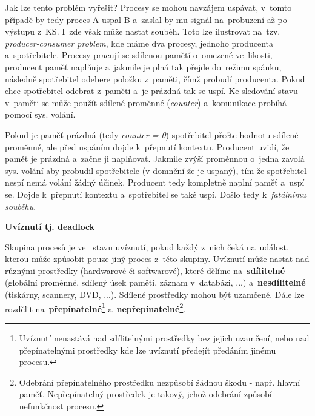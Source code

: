 \vspace{0,5cm}

Jak lze tento problém vyřešit? Procesy se mohou navzájem uspávat, v~tomto případě by tedy proces A uspal B a~zaslal by mu signál na~probuzení až po výstupu z~KS. I~zde však může nastat souběh. Toto lze ilustrovat na~tzv. \emph{producer-consumer problem}, kde máme dva procesy, jednoho producenta a~spotřebitele. Procesy pracují se sdílenou pamětí o~omezené ve~likosti, producent paměť naplňuje a~jakmile je plná tak přejde do~režimu spánku, následně spotřebitel odebere položku z~paměti, čímž probudí producenta. Pokud chce spotřebitel odebrat z~paměti a~je prázdná tak se uspí. Ke sledování stavu v~paměti se může použít sdílené proměnné (\emph{counter}) a~komunikace probíhá pomocí sys. volání.

\vspace{0,5cm}

Pokud je paměť prázdná (tedy \emph{counter = 0}) spotřebitel přečte hodnotu sdílené proměnné, ale před uspáním dojde k~přepnutí kontextu. Producent uvidí, že paměť je prázdná a~začne ji naplňovat. Jakmile zvýší proměnnou o~jedna zavolá sys. volání aby probudil spotřebitele (v domnění že je uspaný), tím že spotřebitel nespí nemá volání žádný účinek. Producent tedy kompletně naplní paměť a~uspí se. Dojde k~přepnutí kontextu a~spotřebitel se také uspí. Došlo tedy k~\emph{fatálnímu souběhu}. 

\begin{large}
    \vspace{0,5cm}
    \textbf{Uvíznutí tj. deadlock}    
\end{large}

Skupina procesů je ve~ stavu uvíznutí, pokud každý z~nich čeká na~událost, kterou může způsobit pouze jiný proces z~této skupiny. Uvíznutí může nastat nad různými prostředky (hardwarové či softwarové), které dělíme na~\textbf{sdílitelné} (globální proměnné, sdílený úsek paměti, záznam v~databázi, ...) a~\textbf{nesdílitelné} (tiskárny, scannery, DVD, ...). Sdílené prostředky mohou být uzamčené. Dále lze rozdělit na~\textbf{přepínatelné}\footnote{Uvíznutí nenastává nad sdílitelnými prostředky bez jejich uzamčení, nebo nad přepínatelnými prostředky kde lze uvíznutí předejít předáním jinému procesu.} a~\textbf{nepřepínatelné}\footnote{Odebrání přepínatelného prostředku nezpůsobí žádnou škodu - např. hlavní paměť. Nepřepínatelný prostředek je takový, jehož odebrání způsobí nefunkčnost procesu.}. 

\vspace{0,5cm}

